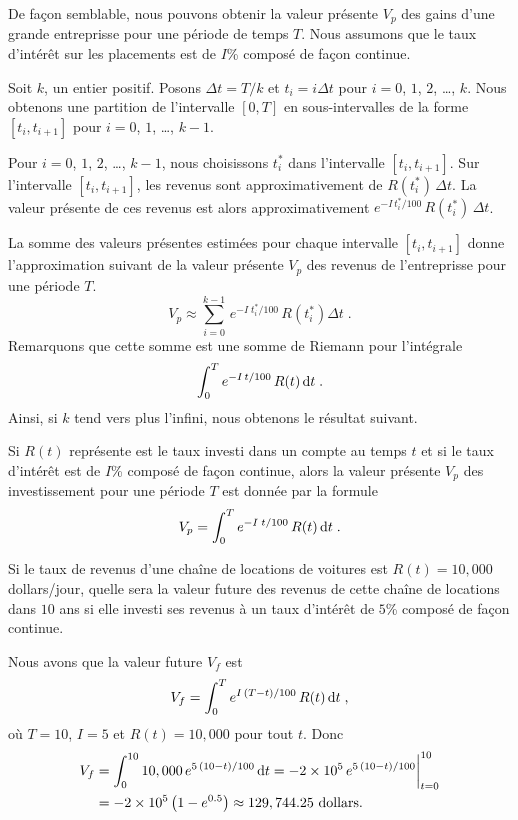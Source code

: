 {De façon semblable, nous pouvons obtenir la valeur présente $V_p$ des gains
d'une grande entreprisse pour une période de temps $T$.  Nous assumons que
le taux d'intérêt sur les placements est de $I$\% composé de façon
continue.

Soit $k$, un entier positif.  Posons
$\Delta t = T/k$ et $t_i = i \Delta t$
pour $i=0$, $1$, $2$, \ldots, $k$.  Nous obtenons une partition de l'intervalle
$[0,T]$ en sous-intervalles de la forme $[t_i,t_{i+1}]$ pour $i=0$, $1$,
\ldots, $k-1$.

Pour $i=0$, $1$, $2$, \ldots, $k-1$, nous choisissons $t_i^\ast$ dans
l'intervalle $[t_i,t_{i+1}]$.  Sur l'intervalle $[t_i, t_{i+1}]$, les
revenus sont
approximativement de $R(t_i^\ast)\, \Delta t$.  La valeur présente de ces
revenus est alors approximativement
$\displaystyle e^{-I\,t_i^\ast/100} \,R(t_i^\ast)\, \Delta t$.

La somme des valeurs présentes estimées pour chaque intervalle
$[t_i,t_{i+1}]$ donne l'approximation suivant de la valeur présente
$V_p$ des revenus de l'entreprisse pour une période $T$.
\[
V_p \approx \sum_{i=0}^{k-1} \,e^{-I\;t_i^\ast/100} \,R(t_i^\ast)
\Delta t \; .
\]
Remarquons que cette somme est une somme de Riemann pour l'intégrale
\[
\int_0^T e^{-I\,t/100} \,R(t) \,\mathrm{d}t \; .
\]
Ainsi, si $k$ tend vers plus l'infini, nous obtenons le résultat suivant.

\begin{focus}{\mth} 
Si $R(t)$ représente est le taux investi dans un compte au temps $t$
et si le taux d'intérêt est de $I$\% composé de façon continue, alors la
valeur présente $V_p$ des investissement pour une période $T$ est
donnée par la formule
\[
V_p = \int_0^T e^{-I\;t/100} \,R(t) \,\mathrm{d}t \; .
\]
\end{focus}

\begin{egg}
Si le taux de revenus d'une chaîne de locations de voitures est
$R(t) = 10,000$ dollars/jour, quelle sera la valeur future des revenus
de cette chaîne de locations dans $10$ ans si elle investi ses revenus
à un taux d'intérêt de $5$\% composé de façon continue.

Nous avons que la valeur future $V_f$ est
\[
V_f = \int_0^T e^{I\,(T-t)/100} \,R(t) \,\mathrm{d}t \; ,
\]
où $T=10$, $I=5$ et $R(t)=10,000$ pour tout $t$.  Donc
\begin{align*}
V_f &= \int_0^{10} 10,000\, e^{5\,(10-t)/100} \,\mathrm{d}t
= -2\times 10^5\, e^{5\,(10-t)/100} \bigg|_{t=0}^{10} \\
&= -2\times 10^5 \left(1-e^{0.5}\right) \approx 129,744.25 \text{ dollars}.
\end{align*}
\end{egg}

}
